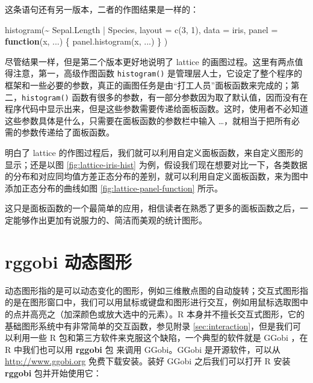 \documentclass[
  b5paper,
  UTF8,twoside]{book}
\newenvironment{Shaded}{\begin{snugshade}}{\end{snugshade}}
\newcommand{\AttributeTok}[1]{\textcolor[rgb]{0.77,0.63,0.00}{#1}}
\newcommand{\ControlFlowTok}[1]{\textcolor[rgb]{0.13,0.29,0.53}{\textbf{#1}}}
\newcommand{\DecValTok}[1]{\textcolor[rgb]{0.00,0.00,0.81}{#1}}
\newcommand{\FunctionTok}[1]{\textcolor[rgb]{0.00,0.00,0.00}{#1}}
\newcommand{\NormalTok}[1]{#1}
\newcommand{\SpecialCharTok}[1]{\textcolor[rgb]{0.00,0.00,0.00}{#1}}
\begin{document}
这条语句还有另一版本，二者的作图结果是一样的：

\begin{Shaded}
\begin{Highlighting}[]
\FunctionTok{histogram}\NormalTok{(}\SpecialCharTok{\textasciitilde{}}\NormalTok{ Sepal.Length }\SpecialCharTok{|}\NormalTok{ Species,}
  \AttributeTok{layout =} \FunctionTok{c}\NormalTok{(}\DecValTok{3}\NormalTok{, }\DecValTok{1}\NormalTok{), }\AttributeTok{data =}\NormalTok{ iris,}
  \AttributeTok{panel =} \ControlFlowTok{function}\NormalTok{(x, ...) \{}
    \FunctionTok{panel.histogram}\NormalTok{(x, ...)}
\NormalTok{  \}}
\NormalTok{)}
\end{Highlighting}
\end{Shaded}

尽管结果一样，但是第二个版本更好地说明了 lattice 的画图过程。这里有两点值得注意，第一，高级作图函数 \texttt{histogram()} 是管理层人士，它设定了整个程序的框架和一些必要的参数，真正的画图任务是由``打工人员''面板函数来完成的；第二，\texttt{histogram()} 函数有很多的参数，有一部分参数因为取了默认值，因而没有在程序代码中显示出来，但是这些参数需要传递给面板函数。这时，使用者不必知道这些参数具体是什么，只需要在面板函数的参数栏中输入 \ldots，就相当于把所有必需的参数传递给了面板函数。

明白了 lattice 的作图过程后，我们就可以利用自定义面板函数，来自定义图形的显示；还是以图 \ref{fig:lattice-iris-hist} 为例，假设我们现在想要对比一下，各类数据的分布和对应同均值方差正态分布的差别，就可以利用自定义面板函数，来为图中添加正态分布的曲线如图 \ref{fig:lattice-panel-function} 所示。

这只是面板函数的一个最简单的应用，相信读者在熟悉了更多的面板函数之后，一定能够作出更加有说服力的、简洁而美观的统计图形。

\hypertarget{sec:dynamic-graphics}{%
\section{rggobi 动态图形}\label{sec:dynamic-graphics}}

动态图形指的是可以动态变化的图形，例如三维散点图的自动旋转；交互式图形指的是在图形窗口中，我们可以用鼠标或键盘和图形进行交互，例如用鼠标选取图中的点并高亮之（加深颜色或放大选中的元素）。R 本身并不擅长交互式图形，它的基础图形系统中有非常简单的交互函数，参见附录 \ref{sec:interaction}，但是我们可以利用一些 R 包和第三方软件来克服这个缺陷，一个典型的软件就是 GGobi \citep{Cook07}，在 R 中我们也可以用 \textbf{rggobi} 包 \citep{rggobi} 来调用 GGobi。GGobi 是开源软件，可以从 \url{http://www.ggobi.org} 免费下载安装。装好 GGobi 之后我们可以打开 R 安装 \textbf{rggobi} 包并开始使用它：
\end{document}
